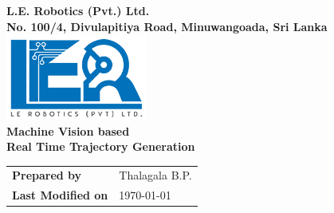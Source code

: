 \begin{titlepage}
\center %

\textbf{\Large L.E. Robotics (Pvt.) Ltd.}\\[0.5cm]
\textbf{\large No. 100/4, Divulapitiya Road, Minuwangoada,	Sri Lanka}\\[3cm]

\includegraphics[width=0.35\textwidth]{figures/logoler}\\[3cm]

	
\textbf{\Huge Machine Vision based\\ Real Time Trajectory Generation}\\[6cm]





\vfill
\begin{flushright}
	\begin{tabular}[!h]{ l l}
\textbf{\large Prepared by} & {\large Thalagala B.P.}\\
\textbf{\large Last Modified on}&  {\large \today}
\end{tabular}
\end{flushright}

%



\end{titlepage}